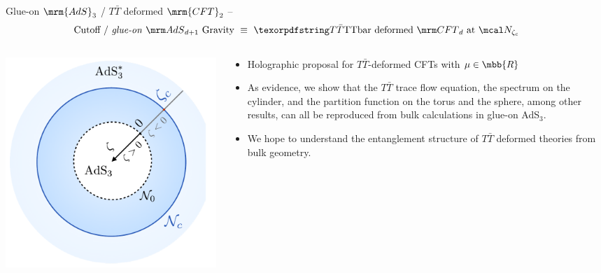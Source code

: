 \documentclass[aspectratio=169,10pt
	,noamsthm
]{beamer}
\newcommand{\TTbar}{\texorpdfstring{\ensuremath{T\bar{T}}}{TTbar}\xspace}
\begin{document}
\begin{frame}{Glue-on $\mrm{AdS}_3$ / \TTbar deformed $\mrm{CFT}_2$}{%
	\textcite{Apolo:2023vnm} -- 
}
\vspace{-1.2\baselineskip}
\begin{equation}
\stateGlueon
\end{equation}
\vspace{-.3\baselineskip}
\begin{columns}
\begin{column}{.3\textwidth}
\centering
\includegraphics[width=\linewidth]{img/diagram.pdf}
\end{column}
\hspace{-1em}
\begin{column}{.7\textwidth}
\begin{itemize}
\item Holographic proposal for $T\bar T$-deformed CFTs with $\mu \in \mbb{R}$

\item As evidence, we show that the $T\bar T$ trace flow equation, the spectrum on the cylinder, and the partition function on the torus and the sphere, among other results, can all be reproduced from bulk calculations in glue-on AdS$_3$.

\pause
\item We hope to understand the entanglement structure of \TTbar deformed theories from bulk geometry.
\end{itemize}
\end{column}
\end{columns}
\end{frame}
\end{document}
